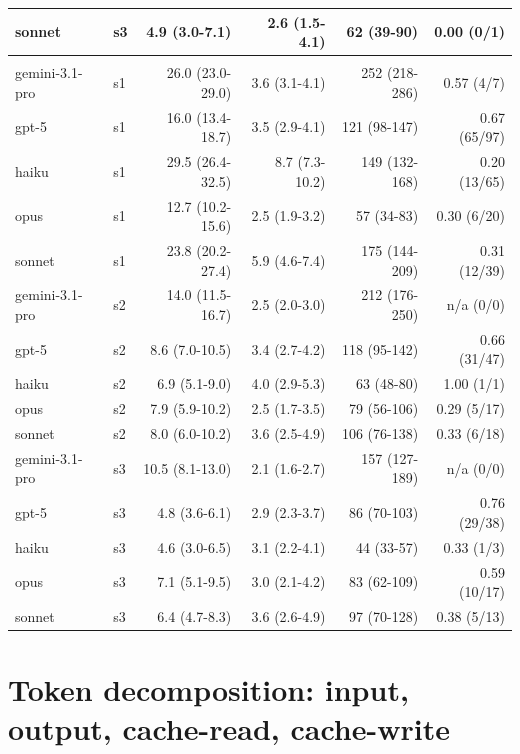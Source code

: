 \documentclass[10pt]{article} %
\begin{document}
\begin{table}[h]
\begin{center}
\begin{tabular}{llrrrr}
        sonnet         & s3 & 4.9 (3.0-7.1)    & 2.6 (1.5-4.1)  & 62 (39-90)    & 0.00 (0/1) \\
        \hline \\
        gemini-3.1-pro & s1 & 26.0 (23.0-29.0) & 3.6 (3.1-4.1)  & 252 (218-286) & 0.57 (4/7) \\
        gpt-5          & s1 & 16.0 (13.4-18.7) & 3.5 (2.9-4.1)  & 121 (98-147)  & 0.67 (65/97) \\
        haiku          & s1 & 29.5 (26.4-32.5) & 8.7 (7.3-10.2) & 149 (132-168) & 0.20 (13/65) \\
        opus           & s1 & 12.7 (10.2-15.6) & 2.5 (1.9-3.2)  & 57 (34-83)    & 0.30 (6/20) \\
        sonnet         & s1 & 23.8 (20.2-27.4) & 5.9 (4.6-7.4)  & 175 (144-209) & 0.31 (12/39) \\
        gemini-3.1-pro & s2 & 14.0 (11.5-16.7) & 2.5 (2.0-3.0)  & 212 (176-250) & n/a (0/0) \\
        gpt-5          & s2 & 8.6 (7.0-10.5)   & 3.4 (2.7-4.2)  & 118 (95-142)  & 0.66 (31/47) \\
        haiku          & s2 & 6.9 (5.1-9.0)    & 4.0 (2.9-5.3)  & 63 (48-80)    & 1.00 (1/1) \\
        opus           & s2 & 7.9 (5.9-10.2)   & 2.5 (1.7-3.5)  & 79 (56-106)   & 0.29 (5/17) \\
        sonnet         & s2 & 8.0 (6.0-10.2)   & 3.6 (2.5-4.9)  & 106 (76-138)  & 0.33 (6/18) \\
        gemini-3.1-pro & s3 & 10.5 (8.1-13.0)  & 2.1 (1.6-2.7)  & 157 (127-189) & n/a (0/0) \\
        gpt-5          & s3 & 4.8 (3.6-6.1)    & 2.9 (2.3-3.7)  & 86 (70-103)   & 0.76 (29/38) \\
        haiku          & s3 & 4.6 (3.0-6.5)    & 3.1 (2.2-4.1)  & 44 (33-57)    & 0.33 (1/3) \\
        opus           & s3 & 7.1 (5.1-9.5)    & 3.0 (2.1-4.2)  & 83 (62-109)   & 0.59 (10/17) \\
        sonnet         & s3 & 6.4 (4.7-8.3)    & 3.6 (2.6-4.9)  & 97 (70-128)   & 0.38 (5/13) \\
    \end{tabular}
    \end{center}
    \end{table}

\FloatBarrier


\section{Token decomposition: input, output, cache-read, cache-write}\label{app:rq3_tokens_split}
\end{document}
